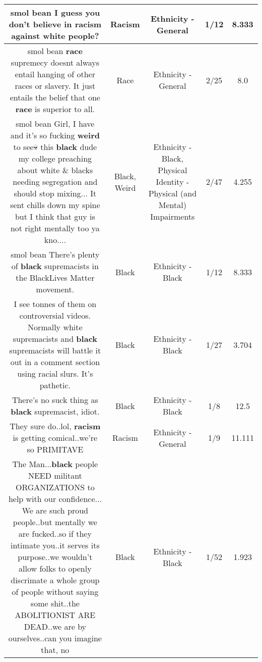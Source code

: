 \documentclass[11pt]{article}
\newlength\mylength
\begin{document}
\begin{center}
\begin{longtable}{|C{.65\mylength}|C{.30\mylength}|C{.12\mylength}|C{.12\mylength}|C{.12\mylength}|}
  \small smol bean I guess you don't believe in \textbf{racism} against white people?\normalsize   & Racism & Ethnicity - General & 1/12 & 8.333 \\  \hline
  \small smol bean \textbf{race} supremecy doesnt always entail hanging of other races or slavery. It just entails the belief that one \textbf{race} is superior to all.\normalsize   & Race & Ethnicity - General & 2/25 & 8.0 \\  \hline
  \small smol bean Girl, I have and it's so fucking \textbf{weird} to see💀 this \textbf{black} dude \@ my college preaching about white \& blacks needing segregation and should stop mixing... It sent chills down my spine but I think that guy is not right mentally too ya kno....\normalsize   & Black, Weird & Ethnicity - Black, Physical Identity - Physical (and Mental) Impairments & 2/47 & 4.255 \\  \hline
  \small smol bean There's plenty of \textbf{black} supremacists in the BlackLives Matter movement.\normalsize   & Black & Ethnicity - Black & 1/12 & 8.333 \\  \hline
  \small I see tonnes of them on controversial videos. Normally white supremacists and \textbf{black} supremacists will battle it out in a comment section using racial slurs. It's pathetic.\normalsize   & Black & Ethnicity - Black & 1/27 & 3.704 \\  \hline
  \small There's no suck thing as \textbf{black} supremacist, idiot.\normalsize   & Black & Ethnicity - Black & 1/8 & 12.5 \\  \hline
  \small They sure do..lol, \textbf{racism} is getting comical..we're so PRIMITAVE\normalsize   & Racism & Ethnicity - General & 1/9 & 11.111 \\  \hline
  \small The Man...\textbf{black} people NEED militant ORGANIZATIONS to help with our confidence... We are such proud people..but mentally we are fucked..so if they intimate you..it serves its purpose..we wouldn't allow folks to openly discrimate a whole group of people without saying some shit..the ABOLITIONIST ARE DEAD..we are by ourselves..can you imagine that, no\normalsize   & Black & Ethnicity - Black & 1/52 & 1.923 \\  \hline

\end{longtable}
\end{center}
\end{document}
